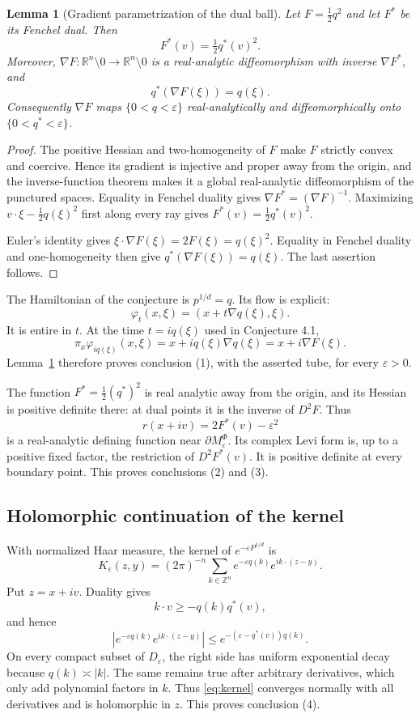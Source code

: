 \documentclass[11pt]{article}
\newtheorem{lemma}{Lemma}
\theoremstyle{remark}
\newcommand{\R}{\mathbb R}
\newcommand{\Z}{\mathbb Z}
\newcommand{\eps}{\varepsilon}
\begin{document}
\begin{lemma}[Gradient parametrization of the dual ball]\label{lem:legendre}
Let $F=\tfrac12q^2$ and let $F^*$ be its Fenchel dual.  Then
\[
F^*(v)=\tfrac12q^*(v)^2.
\]
Moreover, $\nabla F:\R^n\setminus0\to\R^n\setminus0$ is a real-analytic
diffeomorphism with inverse $\nabla F^*$, and
\[
q^*(\nabla F(\xi))=q(\xi).
\]
Consequently $\nabla F$ maps $\{0<q<\eps\}$ real-analytically and
diffeomorphically onto $\{0<q^*<\eps\}$.
\end{lemma}

\begin{proof}
The positive Hessian and two-homogeneity of $F$ make $F$ strictly convex and
coercive.  Hence its gradient is injective and proper away from the origin,
and the inverse-function theorem makes it a global real-analytic
diffeomorphism of the punctured spaces.  Equality in Fenchel duality gives
$\nabla F^*=(\nabla F)^{-1}$.  Maximizing
$v\cdot\xi-\tfrac12q(\xi)^2$ first along every ray gives
$F^*(v)=\tfrac12q^*(v)^2$.

Euler's identity gives
$\xi\cdot\nabla F(\xi)=2F(\xi)=q(\xi)^2$.  Equality in Fenchel duality and
one-homogeneity then give
$q^*(\nabla F(\xi))=q(\xi)$.  The last assertion follows.
\end{proof}

The Hamiltonian of the conjecture is $p^{1/d}=q$.  Its flow is explicit:
\[
\varphi_t(x,\xi)=(x+t\nabla q(\xi),\xi).
\]
It is entire in $t$.  At the time $t=iq(\xi)$ used in Conjecture 4.1,
\[
\pi_x\varphi_{iq(\xi)}(x,\xi)
=x+iq(\xi)\nabla q(\xi)
=x+i\nabla F(\xi).
\]
Lemma~\ref{lem:legendre} therefore proves conclusion (1), with the asserted
tube, for every $\eps>0$.

The function $F^*=\tfrac12(q^*)^2$ is real analytic away from the origin, and
its Hessian is positive definite there: at dual points it is the inverse of
$D^2F$.  Thus
\[
r(x+iv)=2F^*(v)-\eps^2
\]
is a real-analytic defining function near $\partial M^\Phi_\eps$.  Its complex
Levi form is, up to a positive fixed factor, the restriction of $D^2F^*(v)$.
It is positive definite at every boundary point.  This proves conclusions
(2) and (3).

\subsection{Holomorphic continuation of the kernel}

With normalized Haar measure, the kernel of $e^{-\eps P^{1/d}}$ is
\begin{equation}\label{eq:kernel}
K_\eps(z,y)=(2\pi)^{-n}\sum_{k\in\Z^n}
e^{-\eps q(k)}e^{ik\cdot(z-y)}.
\end{equation}
Put $z=x+iv$.  Duality gives
\[
k\cdot v\ge -q(k)q^*(v),
\]
and hence
\[
\left|e^{-\eps q(k)}e^{ik\cdot(z-y)}\right|
\le e^{-(\eps-q^*(v))q(k)}.
\]
On every compact subset of $D_\eps$, the right side has uniform exponential
decay because $q(k)\asymp|k|$.  The same remains true after arbitrary
derivatives, which only add polynomial factors in $k$.  Thus
\eqref{eq:kernel} converges normally with all derivatives and is holomorphic
in $z$.  This proves conclusion (4).
\end{document}
